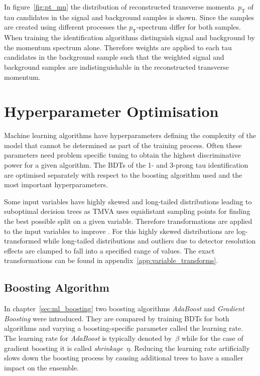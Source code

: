 In figure~\ref{fig:pt_mu} the distribution of reconstructed transverse
momenta~$p_\text{T}$ of tau candidates in the signal and background samples is
shown. Since the samples are created using different processes the
$p_\text{T}$-spectrum differ for both samples. When training the identification
algorithms distinguish signal and background by the momentum spectrum alone.
Therefore weights are applied to each tau candidates in the background sample
such that the weighted signal and background samples are indistinguishable in
the reconstructed transverse momentum.


\section{Hyperparameter Optimisation}
\label{sec:bdt_hyperparam}

Machine learning algorithms have hyperparameters defining the complexity of the
model that cannot be determined as part of the training process. Often these
parameters need problem specific tuning to obtain the highest discriminative
power for a given algorithm. The BDTs of the 1- and 3-prong tau identification
are optimised separately with respect to the boosting algorithm used and the
most important hyperparameters.

Some input variables have highly skewed and long-tailed distributions leading to
suboptimal decision trees as TMVA uses equidistant sampling points for finding
the best possible split on a given variable. Therefore transformations are
applied to the input variables to improve . For this highly skewed distributions
are log-transformed while long-tailed distributions and outliers due to detector
resolution effects are clamped to fall into a specified range of values. The
exact transformations can be found in appendix~\ref{app:variable_transforms}.

\subsection{Boosting Algorithm}
\label{sec:bdt_boosting}

In chapter~\ref{sec:ml_boosting} two boosting algorithms \emph{AdaBoost} and
\emph{Gradient Boosting} were introduced. They are compared by training BDTs for
both algorithms and varying a boosting-specific parameter called the learning
rate. The learning rate for \emph{AdaBoost} is typically denoted by~$\beta$
while for the case of gradient boosting it is called \emph{shrinkage}~$\eta$.
Reducing the learning rate artificially slows down the boosting process by
causing additional trees to have a smaller impact on the ensemble.


